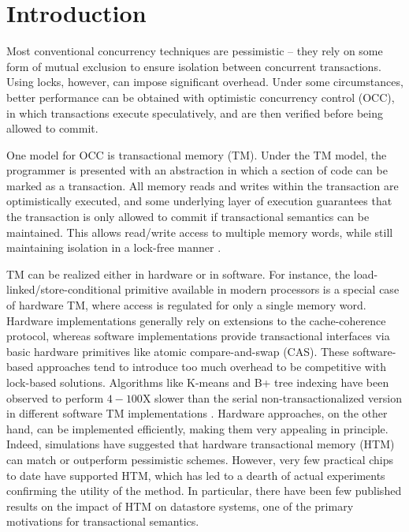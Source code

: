 \section{Introduction} \label{sec:intro}

Most conventional concurrency techniques are pessimistic -- they rely on some
form of mutual exclusion to ensure isolation between concurrent
transactions. Using locks, however, can impose significant overhead. Under some
circumstances, better performance can be obtained with optimistic concurrency
control (OCC), in which transactions execute speculatively, and are then
verified before being allowed to commit.

One model for OCC is transactional memory (TM). Under the TM model, the
programmer is presented with an abstraction in which a section of code can be
marked as a transaction. All memory reads and writes within the transaction are
optimistically executed, and some underlying layer of execution guarantees that
the transaction is only allowed to commit if transactional semantics can be
maintained. This allows read/write access to multiple memory words, while still
maintaining isolation in a lock-free manner \citep{Herlihy93}.

TM can be realized either in hardware or in software. For instance, the
load-linked/store-conditional primitive available in modern processors is a
special case of hardware TM, where access is regulated for only a single memory
word. Hardware implementations generally rely on extensions to the
cache-coherence protocol, whereas software implementations provide transactional
interfaces via basic hardware primitives like atomic compare-and-swap
(CAS). These software-based approaches tend to introduce too much overhead to be
competitive with lock-based solutions. Algorithms like K-means and 
B+ tree indexing have been observed to perform $4-100$X
slower than the serial non-transactionalized version in different 
software TM implementations \citep{cacm08}. 
Hardware approaches, on the other hand,
can be implemented efficiently, making them very appealing in principle. Indeed,
simulations have suggested that hardware transactional memory (HTM) can match or
outperform pessimistic schemes. However, very few practical chips to date have
supported HTM, which has led to a dearth of actual experiments confirming the
utility of the method. In particular, there have been few published results on
the impact of HTM on datastore systems, one of the primary motivations for
transactional semantics.


